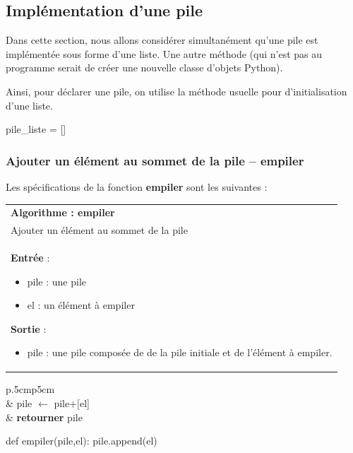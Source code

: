 \documentclass[10pt,fleqn]{article} %
\begin{document}
\subsection{Implémentation d'une pile}
Dans cette section, nous allons considérer simultanément qu'une pile est implémentée sous forme d'une liste. Une autre méthode (qui n'est pas au programme serait de créer une nouvelle classe d'objets Python).

\begin{rappel}
Ainsi, pour déclarer une pile, on utilise la méthode usuelle pour d'initialisation d'une liste. 
\begin{python}
pile_liste = []
\end{python}
\end{rappel}

\subsubsection{Ajouter un élément au sommet de la pile -- \textbf{empiler}}
Les spécifications de la fonction \textbf{empiler} sont les suivantes :

\begin{tabular}{p{\linewidth}}
\hline
\textbf{Algorithme : empiler} \\
Ajouter un élément au sommet de la pile \\
\hline
\textbf{Entrée} : 
\begin{itemize}
\item pile : une pile
\item el : un élément à empiler
\end{itemize}
\textbf{Sortie} : 
\begin{itemize}
\item pile  : une pile composée de de la pile initiale et de l'élément à empiler.
\end{itemize} \\
\hline 
\end{tabular}

\vspace{.5cm}

\noindent \begin{minipage}[c]{.48\linewidth}
\begin{pseudo}
\begin{tabular}{p{.5cm}p{5cm}}
\hline
{}  \\
& pile $\leftarrow$ pile+[el] \\
& \textbf{retourner} pile \\
\hline
\end{tabular}
\end{pseudo}
\end{minipage}\hfill
\begin{minipage}[c]{.48\linewidth}
\begin{py}
\begin{python}
def empiler(pile,el):
    pile.append(el)
\end{python}
\end{py}
\end{minipage}
\end{document}
